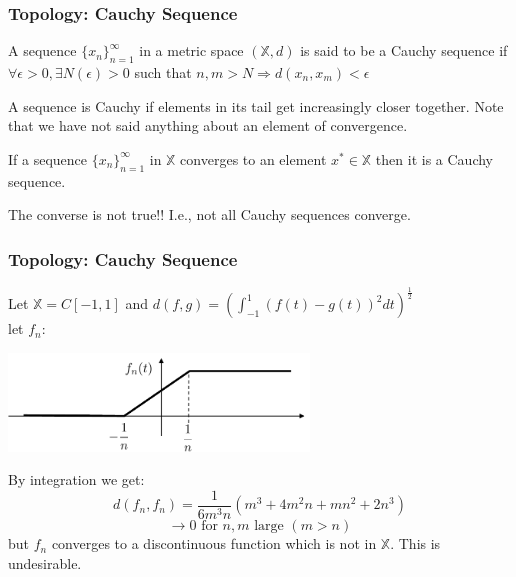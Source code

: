 \documentclass{beamer}
\begin{document}
\begin{frame}\frametitle{Topology: Cauchy Sequence}

\begin{definition}
A sequence $\{x_n\}_{n=1}^\infty$ in a metric space $(\mathbb{X},d)$ is said to be a Cauchy sequence if $\forall \epsilon > 0 , \exists N(\epsilon) > 0$ such that $n,m > N \Rightarrow d(x_n,x_m) < \epsilon$
\end{definition}

A sequence is Cauchy if elements in its tail get increasingly closer together.  Note that we have not said anything about an element of convergence.

\begin{theorem} If a sequence $\{x_n\}_{n=1}^\infty$ in $\mathbb{X}$ converges to an element $x^\ast\in\mathbb{X}$ then it is a Cauchy sequence.  	
\end{theorem}


The converse is not true!!  I.e., not all Cauchy sequences converge.  
\end{frame}


\begin{frame}\frametitle{Topology: Cauchy Sequence}

\begin{example}
Let $\mathbb{X} = C[-1,1]$ and $d(f,g) = \left( \displaystyle\int_{-1}^{1}{(f(t) - g(t))^2dt} \right)^{\frac{1}{2}}$\\
let $f_n:$

\begin{center}
\includegraphics[width=0.6\textwidth]{figures/chap2_discontinuous_function}\\
\end{center}

By integration we get:
\[ d(f_n,f_n) = \frac{1}{6m^3n}(m^3+4m^2n + mn^2 + 2n^3) \]
\[\to 0 \text{ for } n,m \text{ large } (m > n) \]
but $f_n$ converges to a discontinuous function which is not in $\mathbb{X}$.  This is undesirable.
\end{example}
\end{frame}
\end{document}
